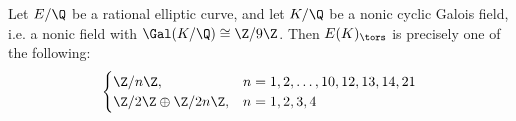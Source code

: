 \begin{frame}[plain]
\begin{thm}
Let $E/\Q$ be a rational elliptic curve, and let $K/\Q$ be a nonic cyclic Galois field, i.e. a nonic field with $\Gal(K/\Q) \cong \Z/9\Z$. Then $E(K)_\tors$ is precisely one of the following:
	\[
	\begin{cases}
	\Z/n\Z, & n= 1, 2, \ldots, 10, 12, 13, 14, 21 \\
	\Z/2\Z \oplus \Z/2n\Z, & n= 1, 2, 3, 4
	\end{cases}
	\]
\end{thm}
\end{frame}





\begin{frame}[plain]
	\begin{table}[!ht] 
	\centering
	\caption{Examples of torsion subgroups $E(K)_\tors$ in $\Phi_\Q^{\cC_9}(9)$.}
	\end{table}
\end{frame}





